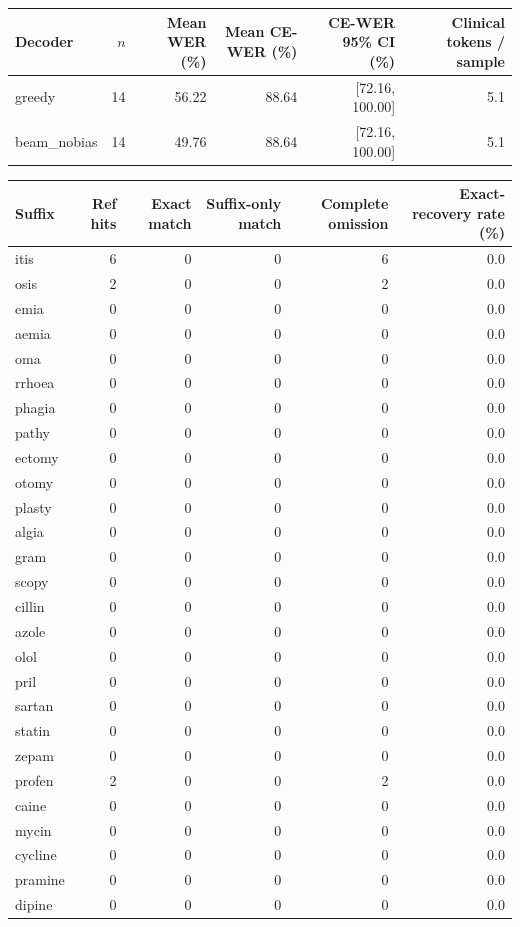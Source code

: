 \begin{tabular}{lrrrrr}
\toprule
Decoder & $n$ & Mean WER (\%) & Mean CE-WER (\%) & CE-WER 95\% CI (\%) & Clinical tokens / sample \\
\midrule
greedy & 14 & 56.22 & 88.64 & [72.16, 100.00] & 5.1 \\
beam\_nobias & 14 & 49.76 & 88.64 & [72.16, 100.00] & 5.1 \\
\bottomrule
\end{tabular}


\begin{tabular}{lrrrrr}
\toprule
Suffix & Ref hits & Exact match & Suffix-only match & Complete omission & Exact-recovery rate (\%) \\
\midrule
itis & 6 & 0 & 0 & 6 & 0.0 \\
osis & 2 & 0 & 0 & 2 & 0.0 \\
emia & 0 & 0 & 0 & 0 & 0.0 \\
aemia & 0 & 0 & 0 & 0 & 0.0 \\
oma & 0 & 0 & 0 & 0 & 0.0 \\
rrhoea & 0 & 0 & 0 & 0 & 0.0 \\
phagia & 0 & 0 & 0 & 0 & 0.0 \\
pathy & 0 & 0 & 0 & 0 & 0.0 \\
ectomy & 0 & 0 & 0 & 0 & 0.0 \\
otomy & 0 & 0 & 0 & 0 & 0.0 \\
plasty & 0 & 0 & 0 & 0 & 0.0 \\
algia & 0 & 0 & 0 & 0 & 0.0 \\
gram & 0 & 0 & 0 & 0 & 0.0 \\
scopy & 0 & 0 & 0 & 0 & 0.0 \\
cillin & 0 & 0 & 0 & 0 & 0.0 \\
azole & 0 & 0 & 0 & 0 & 0.0 \\
olol & 0 & 0 & 0 & 0 & 0.0 \\
pril & 0 & 0 & 0 & 0 & 0.0 \\
sartan & 0 & 0 & 0 & 0 & 0.0 \\
statin & 0 & 0 & 0 & 0 & 0.0 \\
zepam & 0 & 0 & 0 & 0 & 0.0 \\
profen & 2 & 0 & 0 & 2 & 0.0 \\
caine & 0 & 0 & 0 & 0 & 0.0 \\
mycin & 0 & 0 & 0 & 0 & 0.0 \\
cycline & 0 & 0 & 0 & 0 & 0.0 \\
pramine & 0 & 0 & 0 & 0 & 0.0 \\
dipine & 0 & 0 & 0 & 0 & 0.0 \\
\bottomrule
\end{tabular}


